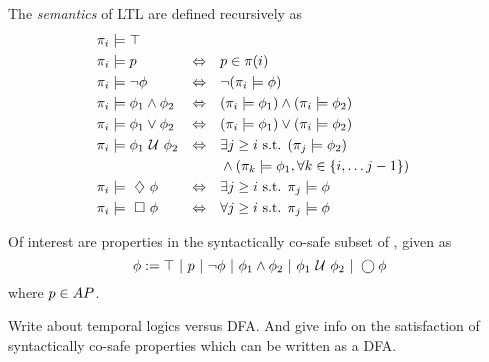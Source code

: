 \documentclass{ifacconf}
\newcommand{\red}[1]{{\color{red} #1}}
\begin{document}
    \begin{definition}
    \label{def:gdtl-semantics}
%    
     The {\em semantics} of LTL  are defined recursively as
    \begin{align*}
    &\word_i \models  \top  & \\
    &\word_i \models p  & \Equiv\quad &p\in\word(i)\\ %
    &\word_i \models \notltl \phi & \Equiv\quad & \notltl (\word_i \models \phi) \\
    &\word_i \models \phi_1 \andltl  \phi_2  & \Equiv\quad & ( \word_i \models \phi_1 ) \andltl ( \word_i \models \phi_2 ) \\
    &\word_i \models \phi_1 \orltl  \phi_2  & \Equiv\quad & ( \word_i \models \phi_1 ) \orltl ( \word_i \models \phi_2 ) \\
    &\word_i \models  \phi_1 \Until \phi_2 & \Equiv\quad & \exists j \geq i \text{ s.t. } (\word_j \models \phi_2 ) \\
    & & & \andltl (\word_k \models \phi_1, \forall k \in \{i, \ldots j-1\})\\
    &\word_i \models \Event \phi  & \Equiv\quad & \exists j \geq i \text{ s.t. }\word_j \models \phi \\
    &\word_i \models \Always \phi  & \Equiv\quad & \forall j \geq i \text{ s.t. }\word_j \models \phi
    \end{align*}
    
    \end{definition}



Of interest are properties in the syntactically co-safe subset of \DTL, given as
    \begin{equation}\label{eq:scLTL}
     \phi :=  \top \ |\ p \ |\ \neg \phi \ |\ \phi_1 \wedge \phi_2 \ |\ \phi_1 \ \mathcal{U}\  \phi_2 \ |\ \bigcirc \phi
    \end{equation}     where $p\in AP$.
     
\red{Write about temporal logics versus DFA. And give info on the satisfaction of syntactically co-safe properties which can be written as a DFA.}
\end{document}
